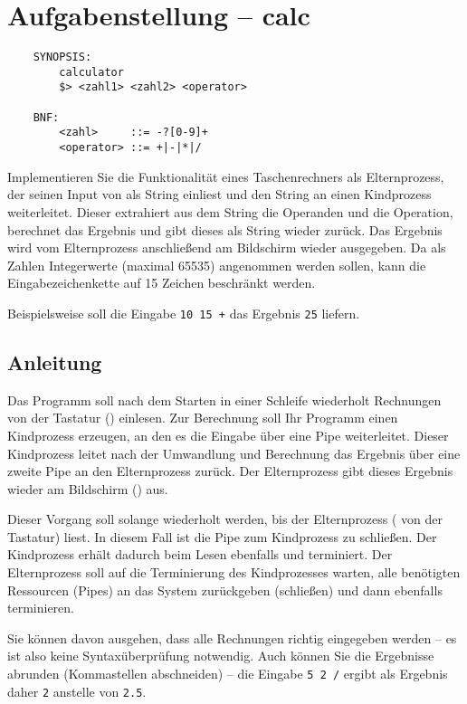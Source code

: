 




\section*{Aufgabenstellung -- calc}

\begin{verbatim}
    SYNOPSIS:
        calculator
        $> <zahl1> <zahl2> <operator>

    BNF:
        <zahl>     ::= -?[0-9]+
        <operator> ::= +|-|*|/
\end{verbatim}

Implementieren Sie die Funktionalit{\"a}t eines Taschenrechners als
Elternprozess, der seinen Input
von  als String einliest und den String an einen
Kindprozess weiterleitet. Dieser extrahiert aus dem String die
Operanden und die Operation, berechnet das Ergebnis und gibt dieses
als String wieder zurück. Das Ergebnis wird vom Elternprozess
anschließend am Bildschirm wieder ausgegeben. Da als Zahlen
Integerwerte (maximal 65535) angenommen werden sollen, kann die
Eingabezeichenkette auf 15 Zeichen beschränkt werden.

Beispielsweise soll die Eingabe \verb_10 15 +_ das Ergebnis \verb_25_
liefern.

\subsection*{Anleitung}

Das Programm soll nach dem Starten in einer Schleife wiederholt
Rechnungen von der Tastatur () einlesen. Zur
Berechnung soll Ihr Programm einen Kindprozess erzeugen, an den
es die Eingabe über eine Pipe weiterleitet. Dieser Kindprozess
leitet nach der Umwandlung und Berechnung das Ergebnis über eine
zweite Pipe an den Elternprozess zurück. Der Elternprozess
gibt dieses Ergebnis wieder am Bildschirm () aus.

Dieser Vorgang soll solange wiederholt werden, bis der Elternprozess
 ( von der Tastatur) liest.
In diesem Fall ist die Pipe zum Kindprozess zu schließen. Der
Kindprozess erhält dadurch beim Lesen ebenfalls 
und terminiert. Der Elternprozess soll auf die Terminierung des
Kindprozesses warten, alle benötigten Ressourcen (Pipes) an das
System zurückgeben (schließen) und dann ebenfalls terminieren.

Sie können davon ausgehen, dass alle Rechnungen richtig eingegeben
werden -- es ist also keine Syntaxüberprüfung notwendig. Auch können
Sie die Ergebnisse abrunden (Kommastellen abschneiden) -- die Eingabe
\verb_5 2 /_ ergibt als Ergebnis daher \verb_2_ anstelle von
\verb_2.5_.

\osueguidelinestwo


